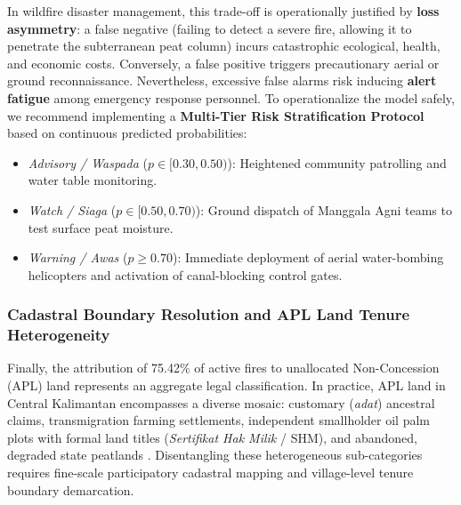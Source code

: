 In wildfire disaster management, this trade-off is operationally justified by \textbf{loss asymmetry}: a false negative (failing to detect a severe fire, allowing it to penetrate the subterranean peat column) incurs catastrophic ecological, health, and economic costs. Conversely, a false positive triggers precautionary aerial or ground reconnaissance. Nevertheless, excessive false alarms risk inducing \textbf{alert fatigue} among emergency response personnel. To operationalize the model safely, we recommend implementing a \textbf{Multi-Tier Risk Stratification Protocol} based on continuous predicted probabilities:
\begin{itemize}
    \item \textit{Advisory / Waspada} ($p \in [0.30, 0.50)$): Heightened community patrolling and water table monitoring.
    \item \textit{Watch / Siaga} ($p \in [0.50, 0.70)$): Ground dispatch of Manggala Agni teams to test surface peat moisture.
    \item \textit{Warning / Awas} ($p \ge 0.70$): Immediate deployment of aerial water-bombing helicopters and activation of canal-blocking control gates.
\end{itemize}

\subsubsection{Cadastral Boundary Resolution and APL Land Tenure Heterogeneity}
Finally, the attribution of 75.42\% of active fires to unallocated Non-Concession (APL) land represents an aggregate legal classification. In practice, APL land in Central Kalimantan encompasses a diverse mosaic: customary (\textit{adat}) ancestral claims, transmigration farming settlements, independent smallholder oil palm plots with formal land titles (\textit{Sertifikat Hak Milik} / SHM), and abandoned, degraded state peatlands \citep{Putranto2023LandUsePol}. Disentangling these heterogeneous sub-categories requires fine-scale participatory cadastral mapping and village-level tenure boundary demarcation.

